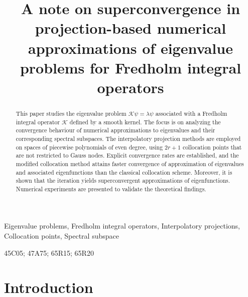 \documentclass[]{interact}
\theoremstyle{plain}%
\theoremstyle{definition}
\theoremstyle{remark}
\begin{document}

\title{A note on superconvergence in projection-based numerical approximations of eigenvalue problems for Fredholm integral operators}

\author{
}

\maketitle

\begin{abstract}
 This paper studies the eigenvalue problem $\mathcal{K}\psi = \lambda \psi$ associated with a Fredholm integral operator $\mathcal{K}$ defined by a smooth kernel. 
 The focus is on analyzing the convergence behaviour of numerical approximations to eigenvalues and their corresponding spectral subspaces. The interpolatory projection methods are employed on spaces of piecewise polynomials of even degree, using $2r+1$ collocation points that are not restricted to Gauss nodes. Explicit convergence rates are established, and the modified collocation method attains faster convergence of approximation of eigenvalues and associated eigenfunctions than the classical collocation scheme. Moreover, it is shown that the iteration yields superconvergent approximations of eigenfunctions. Numerical experiments are presented to validate the theoretical findings.
\end{abstract}

\begin{keywords}
Eigenvalue problems, Fredholm integral operators,  Interpolatory projections, Collocation points, Spectral subspace
\end{keywords}

\begin{amscode}
45C05; 47A75; 65R15; 65R20
\end{amscode}

\setcounter{equation}{0}
\section{Introduction}
\end{document}
